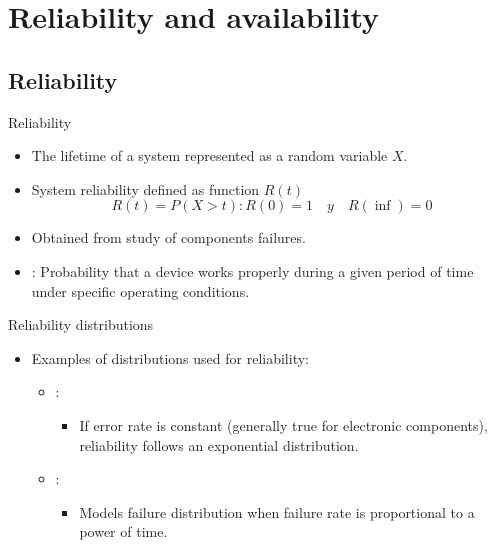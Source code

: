 \section{Reliability and availability}

\subsection{Reliability}

\begin{frame}[t]{Reliability}
\begin{itemize}
  \item The lifetime of a system represented as a random variable
        $X$.

  \item System reliability defined as function $R(t)$
\begin{displaymath}
R(t) = P(X > t) : R(0) = 1 \quad y \quad R(\inf) = 0
\end{displaymath}

  \item Obtained from study of components failures.

  \item {}:
        Probability that a device works properly during a given period of 
        time under specific operating conditions.
        
\end{itemize}
\end{frame}

\begin{frame}[t]{Reliability distributions}
\begin{itemize}
  \item Examples of distributions used for reliability:
    \begin{itemize}
      \item {}:
        \begin{itemize}
          \item If error rate is constant (generally true for electronic components),
                reliability follows an exponential distribution.
        \end{itemize}
      \item {}:
        \begin{itemize}
          \item Models failure distribution when failure rate is proportional to a power of time.
        \end{itemize}
    \end{itemize}
\end{itemize}
\end{frame}


